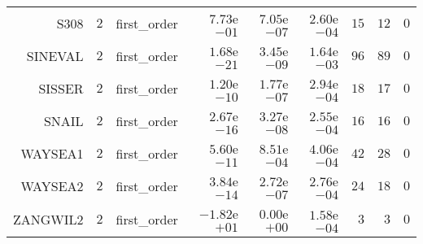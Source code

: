 \begin{longtable}{rrrrrrrrr}
S308 & \(     2\) & first\_order & \( 7.73\)e\(-01\) & \( 7.05\)e\(-07\) & \( 2.60\)e\(-04\) & \(    15\) & \(    12\) & \(     0\) \\
SINEVAL & \(     2\) & first\_order & \( 1.68\)e\(-21\) & \( 3.45\)e\(-09\) & \( 1.64\)e\(-03\) & \(    96\) & \(    89\) & \(     0\) \\
SISSER & \(     2\) & first\_order & \( 1.20\)e\(-10\) & \( 1.77\)e\(-07\) & \( 2.94\)e\(-04\) & \(    18\) & \(    17\) & \(     0\) \\
SNAIL & \(     2\) & first\_order & \( 2.67\)e\(-16\) & \( 3.27\)e\(-08\) & \( 2.55\)e\(-04\) & \(    16\) & \(    16\) & \(     0\) \\
WAYSEA1 & \(     2\) & first\_order & \( 5.60\)e\(-11\) & \( 8.51\)e\(-04\) & \( 4.06\)e\(-04\) & \(    42\) & \(    28\) & \(     0\) \\
WAYSEA2 & \(     2\) & first\_order & \( 3.84\)e\(-14\) & \( 2.72\)e\(-07\) & \( 2.76\)e\(-04\) & \(    24\) & \(    18\) & \(     0\) \\
ZANGWIL2 & \(     2\) & first\_order & \(-1.82\)e\(+01\) & \( 0.00\)e\(+00\) & \( 1.58\)e\(-04\) & \(     3\) & \(     3\) & \(     0\) \\\hline
\end{longtable}
